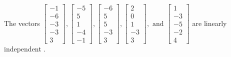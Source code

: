 \begin{exercise}
\begin{exerciseStatement}
  \end{exerciseStatement}
  \begin{exerciseAnswer}
   The vectors \(\left[\begin{array}{r}
-1 \\
-6 \\
-3 \\
-3 \\
3
\end{array}\right] , \left[\begin{array}{r}
-5 \\
5 \\
1 \\
-4 \\
-1
\end{array}\right] , \left[\begin{array}{r}
-6 \\
5 \\
5 \\
-3 \\
3
\end{array}\right] , \left[\begin{array}{r}
2 \\
0 \\
1 \\
-3 \\
3
\end{array}\right] , \text{ and } \left[\begin{array}{r}
1 \\
-3 \\
-5 \\
-2 \\
4
\end{array}\right]\) are 
  	 linearly independent  .
  


  \end{exerciseAnswer}
\end{exercise}